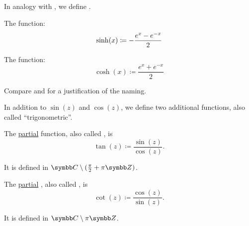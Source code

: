 \begin{definition}\label{def:hyperbolic_trigonometric_functions}
  In analogy with , we define .

  \begin{DefEnum}
     The  function:
    \begin{equation*}
      \sinh(x) \coloneqq - \frac {e^x - e^{-x}} 2 \\
    \end{equation*}

     The  function:
    \begin{equation*}
      \cosh(x) \coloneqq \frac {e^x + e^{-x}} 2
    \end{equation*}
  \end{DefEnum}

  Compare  and  for a justification of the naming.
\end{definition}

\begin{definition}\label{def:derived_trigonometric_functions}
  In addition to \( \sin(z) \) and \( \cos(z) \), we define two additional functions, also called \enquote{trigonometric}.

  \begin{DefEnum}
     The \hyperref[def:function/partial]{partial}  function, also called , is
    \begin{equation*}
      \tan(z) \coloneqq \frac {\sin(z)} {\cos(z)}.
    \end{equation*}

    It is defined in \( \BC \setminus (\tfrac \pi 2 + \pi\BZ) \).

     The \hyperref[def:function/partial]{partial} , also called , is
    \begin{equation*}
      \cot(z) \coloneqq \frac {\cos(z)} {\sin(z)}.
    \end{equation*}

    It is defined in \( \BC \setminus \pi\BZ \).
  \end{DefEnum}
\end{definition}

